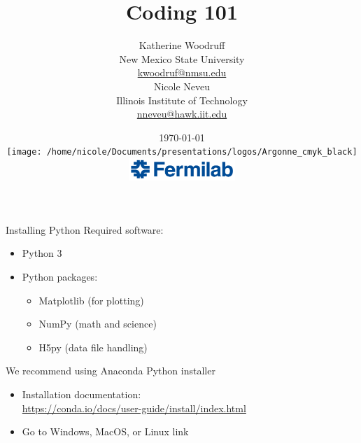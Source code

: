 \documentclass[xcolor=dvipsnames, professionalfonts,t]{beamer}
\title[September 2018]{\vspace{-1em}Coding 101 }
\author[K. Woodruff and N.Neveu]{{\Large{Katherine Woodruff} \\ \small{New Mexico State University} \\
		\url{kwoodruf@nmsu.edu} \\ \vspace{1em} \Large{Nicole Neveu} \\ \small{Illinois Institute of Technology}   \\ \url{nneveu@hawk.iit.edu}    }} \vspace{-5em}
\institute[] %
{   
	  
}
\date{ \today \\
	\texttt{[image: /home/nicole/Documents/presentations/logos/Argonne\_cmyk\_black]}%
	\hfill \hfill \hfill%
	\includegraphics[width=4cm,keepaspectratio]{FNAL}%
}
\begin{document}

\begin{frame}
\titlepage
\end{frame}
\begin{frame}{Installing Python}
  Required software:
  \begin{itemize}
    \item Python 3
    \item Python packages:
    \begin{itemize}
      \item Matplotlib (for plotting)
      \item NumPy (math and science)
      \item H5py (data file handling)
    \end{itemize}
  \end{itemize}
  We recommend using Anaconda Python installer
  \begin{itemize}
    \item Installation documentation: \\
    \url{https://conda.io/docs/user-guide/install/index.html}
    \item Go to Windows, MacOS, or Linux link
  \end{itemize}
\end{frame}
\end{document}
